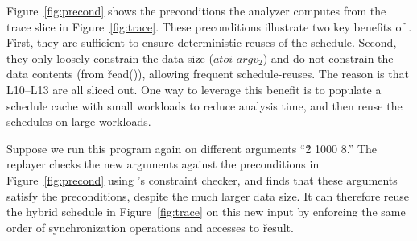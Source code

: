 Figure~\ref{fig:precond} shows the preconditions the analyzer computes
from the trace slice in Figure~\ref{fig:trace}.
These preconditions illustrate two key benefits of \peregrine.
First, they are sufficient to ensure deterministic reuses of the schedule.
Second, they only loosely constrain the data size ($atoi\_argv_2$) and do
not constrain the data contents (from \v{read()}), allowing frequent
schedule-reuses.  The reason is that L10--L13 are all sliced out.
One way to leverage this benefit is to populate a
schedule cache with small workloads to reduce analysis time, and then
reuse the schedules on large workloads.





Suppose we run this program again on different arguments ``\v{2 1000 8}.''
The replayer checks the new arguments against the preconditions in
Figure~\ref{fig:precond} using \klee's constraint checker, and finds that these
arguments satisfy the preconditions, despite the much larger data size.  
It can therefore reuse the hybrid schedule in Figure~\ref{fig:trace}
on this new input by enforcing
the same order of synchronization operations and accesses
to \v{result}.



